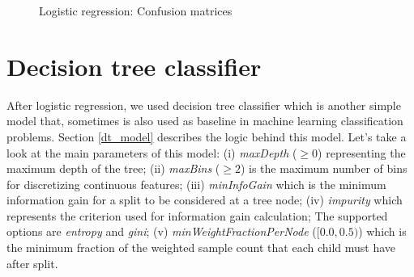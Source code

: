 \documentclass[LaM,binding=0.6cm, english]{sapthesis}
\begin{document}
\begin{figure}[!ht]
  \centering
  \hfill
  \caption{Logistic regression: Confusion matrices}
\end{figure}

\section{Decision tree classifier}

After logistic regression, we used decision tree classifier which is another simple model that, sometimes is also used as baseline in machine learning classification problems. Section \ref{dt_model} describes the logic behind this model. Let's take a look at the main parameters of this model: (i) \textit{maxDepth} ($\ge 0$) representing the maximum depth of the tree; (ii) \textit{maxBins} ($\ge 2$) is the maximum number of bins for discretizing continuous features; (iii) \textit{minInfoGain} which is the minimum information gain for a split to be considered at a tree node; (iv) \textit{impurity} which represents the criterion used for information gain calculation; The supported options are \textit{entropy} and  \textit{gini}; (v) \textit{minWeightFractionPerNode} ($[0.0, 0.5)$) which is the minimum fraction of the weighted sample count that each child must have after split.\cite{pysparkDT}
\end{document}
